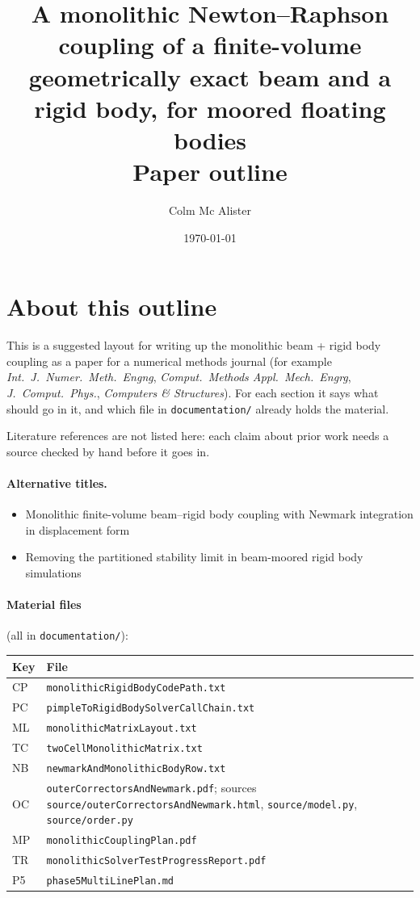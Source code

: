 \documentclass[11pt,a4paper]{article}
\title{A monolithic Newton--Raphson coupling of a finite-volume geometrically
  exact beam and a rigid body, for moored floating bodies\\[4pt]
  \large Paper outline}
\author{Colm Mc Alister}
\date{\today}
\newcommand{\file}[1]{\texttt{#1}}
\begin{document}
\maketitle

\section*{About this outline}

This is a suggested layout for writing up the monolithic beam + rigid body
coupling as a paper for a numerical methods journal (for example
\emph{Int.\ J.\ Numer.\ Meth.\ Engng}, \emph{Comput.\ Methods Appl.\ Mech.\
Engrg}, \emph{J.\ Comput.\ Phys.}, \emph{Computers \& Structures}). For each
section it says what should go in it, and which file in
\file{documentation/} already holds the material.

Literature references are not listed here: each claim about prior work needs
a source checked by hand before it goes in.

\paragraph{Alternative titles.}
\begin{itemize}
  \item Monolithic finite-volume beam--rigid body coupling with Newmark
        integration in displacement form
  \item Removing the partitioned stability limit in beam-moored rigid body
        simulations
\end{itemize}

\paragraph{Material files} (all in \file{documentation/}):

\begin{center}
\begin{tabular}{@{}l>{\raggedright\arraybackslash}p{}@{}}
  \toprule
  Key & File \\
  \midrule
  CP & \file{monolithicRigidBodyCodePath.txt} \\
  PC & \file{pimpleToRigidBodySolverCallChain.txt} \\
  ML & \file{monolithicMatrixLayout.txt} \\
  TC & \file{twoCellMonolithicMatrix.txt} \\
  NB & \file{newmarkAndMonolithicBodyRow.txt} \\
  OC & \file{outerCorrectorsAndNewmark.pdf}; sources
       \file{source/outerCorrectorsAndNewmark.html}, \file{source/model.py},
       \file{source/order.py} \\
  MP & \file{monolithicCouplingPlan.pdf} \\
  TR & \file{monolithicSolverTestProgressReport.pdf} \\
  P5 & \file{phase5MultiLinePlan.md} \\
  \bottomrule
\end{tabular}
\end{center}
\end{document}
